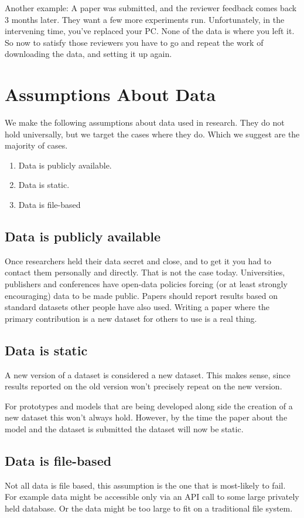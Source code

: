 \documentclass[]{article}
\begin{document}
Another example:
A paper was submitted, and the reviewer feedback comes back 3 months later.
They want a few more experiments run.
Unfortunately, in the intervening time, you've replaced your PC.
None of the data is where you left it.
So now to satisfy those reviewers you have to go and repeat the work of downloading the data,
and setting it up again.


\section{Assumptions About Data}
We make the following assumptions about data used in research.
They do not hold universally, but we target the cases where they do.
Which we suggest are the majority of cases.


\begin{enumerate}
	\item Data is publicly available.
	\item Data is static.
	\item Data is file-based
\end{enumerate}

\subsection{Data is publicly available}
Once researchers held their data secret and close, and to get it you had to contact them personally and directly.
That is not the case today.
Universities, publishers and conferences have open-data policies forcing (or at least strongly encouraging) data to be made public.
Papers should report results based on standard datasets other people have also used.
Writing a paper where the primary contribution is a new dataset for others to use is a real thing.


\subsection{Data is static}
A new version of a dataset is considered a new dataset.
This makes sense, since results reported on the old version won't precisely repeat on the new version.

For prototypes and models that are being developed along side the creation of a new dataset this won't always hold.
However, by the time the paper about the model and the dataset is submitted the dataset will now be static.

\subsection{Data is file-based}
Not all data is file based, this assumption is the one that is most-likely to fail.
For example data might be accessible only via an API call to some large privately held database.
Or the data might be too large to fit on a traditional file system.
\end{document}
